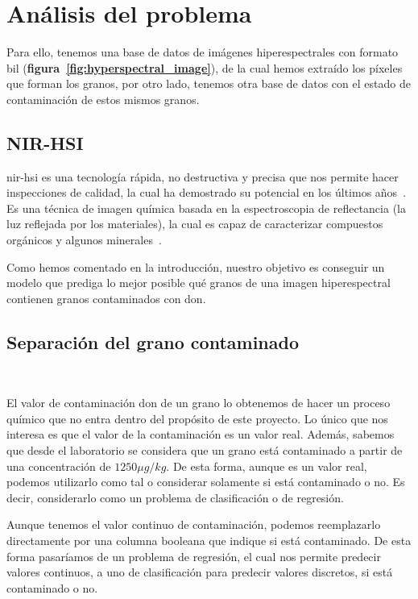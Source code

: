 \section{Análisis del problema}

 Para ello, tenemos una base de datos de imágenes hiperespectrales con formato \acrshort{bil} (\textbf{figura\ \ref{fig:hyperspectral_image}}), de la cual hemos extraído los píxeles que forman los granos, por otro lado, tenemos otra base de datos con el estado de contaminación de estos mismos granos. 


\subsection{NIR-HSI}

\gls{nir-hsi} es una tecnología rápida, no destructiva y precisa que nos permite hacer inspecciones de calidad, la cual ha demostrado su potencial en los últimos años\ \cite{Applicat5:online}. Es una técnica de imagen química basada en la espectroscopia de reflectancia (la luz reflejada por los materiales), la cual es capaz de caracterizar compuestos orgánicos y algunos minerales\ \cite{NIRHyper23:online}.

Como hemos comentado en la introducción, nuestro objetivo es conseguir un modelo que prediga lo mejor posible qué granos de una \gls{imagen hiperespectral} contienen granos contaminados con \acrshort{don}.


\subsection{Separación del grano contaminado}\ \label{sec:separacion}

El valor de contaminación \gls{don} de un grano lo obtenemos de hacer un proceso químico que no entra dentro del propósito de este proyecto. Lo único que nos interesa es que el valor de la contaminación es un valor real. Además, sabemos que desde el laboratorio se considera que un grano está contaminado a partir de una concentración de \(1250 \mu g/kg\). De esta forma, aunque es un valor real, podemos utilizarlo como tal o considerar solamente si está contaminado o no. Es decir, considerarlo como un problema de \gls{clasificación} o de \gls{regresión}.

Aunque tenemos el valor continuo de contaminación, podemos reemplazarlo directamente por una columna booleana que indique si está contaminado. De esta forma pasaríamos de un problema de regresión, el cual nos permite predecir valores continuos, a uno de clasificación para predecir valores discretos, si está contaminado o no.

